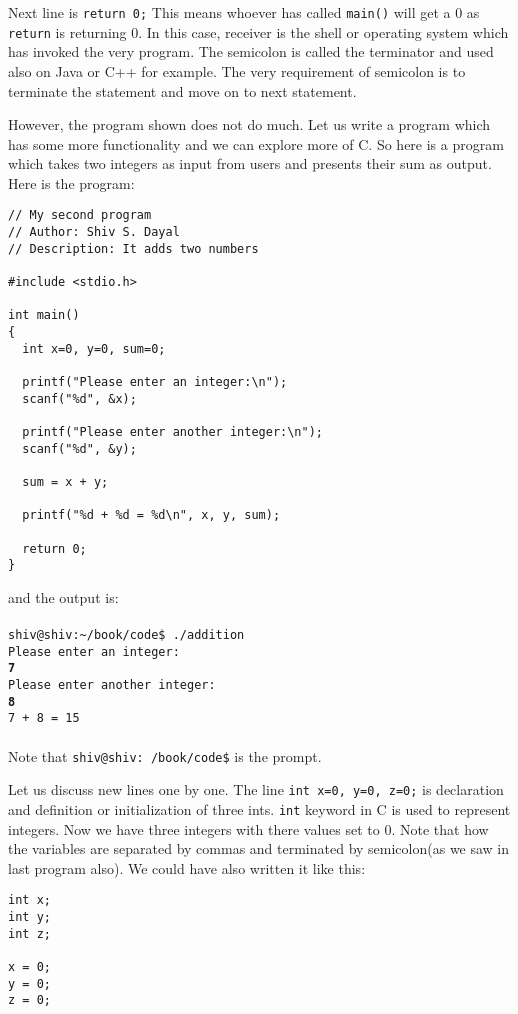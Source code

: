 Next line is \texttt{return 0;} This means whoever has called \texttt{main()}
will get a 0 as \texttt{return} is returning 0. In this case, receiver is the
shell or operating system 
which has invoked the very program. The semicolon is called the terminator and
used also on Java or C++ for example. The very requirement of semicolon is to
terminate the statement and move on to next statement.

However, the program shown does not do much. Let us write a program which has
some more functionality and we can explore more of C. So here is a program
which takes two integers as input from users and presents their sum as
output. Here is the program:

\begin{verbatim}
// My second program
// Author: Shiv S. Dayal
// Description: It adds two numbers

#include <stdio.h>

int main()
{
  int x=0, y=0, sum=0;

  printf("Please enter an integer:\n");
  scanf("%d", &x);

  printf("Please enter another integer:\n");
  scanf("%d", &y);

  sum = x + y;

  printf("%d + %d = %d\n", x, y, sum);

  return 0;
}
\end{verbatim}
and the output is:
\\\\\texttt{shiv@shiv:\textasciitilde/book/code\$ ./addition\\
Please enter an integer:\\
\textbf{7}\\
Please enter another integer:\\
\textbf{8}\\
7 + 8 = 15}\\\\
Note that \texttt{shiv@shiv:~/book/code\$} is the prompt.

Let us discuss new lines one by one. The line \texttt{int x=0, y=0, z=0;} is
declaration and definition or initialization of three ints. \texttt{int}
keyword in C is used to represent integers. Now we have three integers with
there values set to 0. Note that how the variables are separated by commas and
terminated by semicolon(as we saw in last program also). We could have also
written it like this:

\begin{verbatim}
int x;
int y;
int z;

x = 0;
y = 0;
z = 0;
\end{verbatim}

